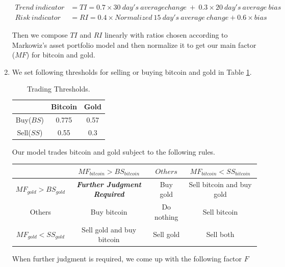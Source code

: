 \documentclass[12pt,a4paper]{article}
\begin{document}
\begin{spacing}{1.2}
\begin{enumerate}
\begin{align*}
	Trend \ indicator &= TI = 0.7 \times 30 \ day's \ average change \ + \ 0.3 \times 20 \ day's \ average \ bias \\
	Risk \ indicator &= RI = 0.4 \times Normalized \ 15 \ day's \ average \ change + 0.6 \times bias
\end{align*}
	
	Then we compose $TI$ and $RI$ linearly with ratios chosen according to Markowiz's asset portfolio model and then normalize it to get our main factor ($MF$) for bitcoin and gold. 
	
	\item We set following thresholds for selling or buying bitcoin and gold in Table \ref{table:memo_threshold}.
	
	\begin{table}[H]
		\renewcommand{\arraystretch}{1.5}
		\caption{Trading Thresholds.}
		\label{table:memo_threshold}
		\begin{center}
			{\footnotesize
				\begin{tabular}{c c c}
					\toprule
					{ } & {Bitcoin} & {Gold} \\
					\midrule
					Buy($BS$) & 0.775 & 0.57 \\
					Sell($SS$) & 0.55 & 0.3 \\
					\bottomrule
			\end{tabular}}
		\end{center}	
	\end{table}

	Our model trades bitcoin and gold subject to the following rules.
	
	\begin{center}
		\begin{tabular}{ |c|c|c|c| } 
			\hline
			 & $MF_{bitcoin} > BS_{bitcoin}$ & $Others$ & $MF_{bitcoin} < SS_{bitcoin}$ \\ 
			\hline
			$MF_{gold} > BS_{gold}$ & \textbf{\textit{Further Judgment Required}}  & Buy gold & Sell bitcoin and buy gold  \\ 
			\hline
			Others & Buy bitcoin & Do nothing & Sell bitcoin \\
			\hline
			$MF_{gold} < SS_{gold}$ & Sell gold and buy bitcoin & Sell gold & Sell both \\ 
			\hline
		\end{tabular}
	\end{center}

	When further judgment is required, we come up with the following factor $F$ 
	

\end{enumerate}
\end{spacing}
\end{document}
